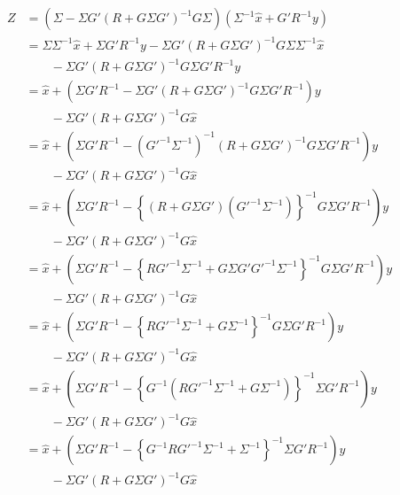 \documentclass[a4paper,12pt]{scrartcl}
\begin{document}
\begin{align*}
    Z &= 
	\left( \Sigma - \Sigma G'(R 
	+ G\Sigma G')^{-1}
	G\Sigma\right) \left(\Sigma^{-1} \hat{x} 
	+ G'R^{-1}y\right) \\
     &= \Sigma \Sigma^{-1} \hat{x} 
	+ \Sigma G'R^{-1}y 
	- \Sigma G'(R + G\Sigma G')^{-1} G\Sigma
	    \Sigma^{-1} \hat{x} \\
	& \qquad - \Sigma G'(R + G\Sigma G')^{-1} G\Sigma
	     G'R^{-1}y \\
     &= \hat{x} 
	+ \left( \Sigma G'R^{-1} 
	 - \Sigma G'(R + G\Sigma G')^{-1} G\Sigma
	     G'R^{-1}\right)y \\
	&\qquad - \Sigma G'(R + G\Sigma G')^{-1} G
	    \hat{x} \\
     &= \hat{x} 
	+ \left( \Sigma G'R^{-1} 
	- (G'^{-1}\Sigma^{-1})^{-1} (R + G\Sigma G')^{-1} G\Sigma
	     G'R^{-1}\right)y \\
	&\qquad - \Sigma G'(R + G\Sigma G')^{-1} G
	    \hat{x} \\
     &= \hat{x} 
	+ \left( \Sigma G'R^{-1} 
	- \left\{(R + G\Sigma G')(G'^{-1}\Sigma^{-1}) 
	    \right\}^{-1}  G\Sigma G'R^{-1}\right)y \\
	&\qquad - \Sigma G'(R + G\Sigma G')^{-1} G
	    \hat{x} \\
     &= \hat{x} 
	+ \left( \Sigma G'R^{-1} 
	- \left\{RG'^{-1}\Sigma^{-1} 
	    + G\Sigma G'G'^{-1}\Sigma^{-1} 
	    \right\}^{-1}  G\Sigma G'R^{-1}\right)y \\
	&\qquad - \Sigma G'(R + G\Sigma G')^{-1} G
	    \hat{x} \\
     &= \hat{x} 
	+ \left( \Sigma G'R^{-1} 
	- \left\{RG'^{-1}\Sigma^{-1} 
	    + G\Sigma^{-1} 
	    \right\}^{-1}  G\Sigma G'R^{-1}\right)y \\
	&\qquad - \Sigma G'(R + G\Sigma G')^{-1} G
	    \hat{x} \\
     &= \hat{x} 
	+ \left( \Sigma G'R^{-1} 
	- \left\{G^{-1} \left(RG'^{-1}\Sigma^{-1} 
	    + G\Sigma^{-1} \right)
	    \right\}^{-1}  \Sigma G'R^{-1}\right)y \\
	&\qquad - \Sigma G'(R + G\Sigma G')^{-1} G
	    \hat{x} \\
     &= \hat{x} 
	+ \left( \Sigma G'R^{-1} 
	- \left\{G^{-1} RG'^{-1}\Sigma^{-1} 
	    + \Sigma^{-1} 
	    \right\}^{-1}  \Sigma G'R^{-1}\right)y \\
	&\qquad - \Sigma G'(R + G\Sigma G')^{-1} G
	    \hat{x} \\
\end{align*}


\end{document}
